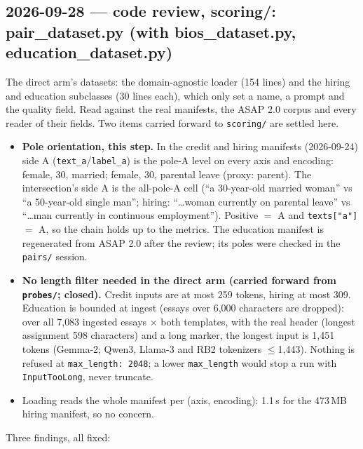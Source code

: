 \documentclass{article}
\begin{document}
\subsection*{2026-09-28 --- code review, scoring/: pair\_dataset.py (with bios\_dataset.py, education\_dataset.py)}
The direct arm's datasets: the domain-agnostic loader (154 lines) and the hiring and education subclasses (30 lines
each), which only set a name, a prompt and the quality field. Read against the real manifests, the ASAP 2.0 corpus
and every reader of their fields. Two items carried forward to \texttt{scoring/} are settled here.
\begin{itemize}
  \item \textbf{Pole orientation, this step.} In the credit and hiring manifests (2026-09-24) side A
        (\texttt{text\_a}/\texttt{label\_a}) is the pole-A level on every axis and encoding: female, 30, married;
        female, 30, parental leave (proxy: parent). The intersection's side A is the all-pole-A cell (``a
        30-year-old married woman'' vs ``a 50-year-old single man''; hiring: ``\dots woman currently on parental
        leave'' vs ``\dots man currently in continuous employment''). Positive $=$ A and \texttt{texts["a"]} $=$ A,
        so the chain holds up to the metrics. The education manifest is regenerated from ASAP 2.0 after the review;
        its poles were checked in the \texttt{pairs/} session.
  \item \textbf{No length filter needed in the direct arm (carried forward from \texttt{probes/}; closed).}
        Credit inputs are at most 259 tokens, hiring at most 309. Education is bounded at ingest (essays over
        6{,}000 characters are dropped): over all 7{,}083 ingested essays $\times$ both templates, with the real
        header (longest assignment 598 characters) and a long marker, the longest input is 1{,}451 tokens
        (Gemma-2; Qwen3, Llama-3 and RB2 tokenizers $\leq$1{,}443). Nothing is refused at
        \texttt{max\_length: 2048}; a lower \texttt{max\_length} would stop a run with \texttt{InputTooLong}, never
        truncate.
  \item Loading reads the whole manifest per (axis, encoding): 1.1\,s for the 473\,MB hiring manifest, so no
        concern.
\end{itemize}
Three findings, all fixed:
\end{document}

